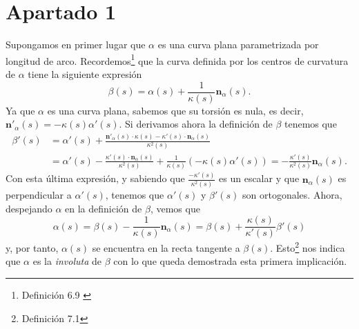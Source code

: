 \section{Apartado 1}
Supongamos en primer lugar que $\alpha$ es una curva plana parametrizada por
longitud de arco. Recordemos\footnote{Definición 6.9 \cite{sanjurjo}} que la
curva definida por los centros de curvatura de $\alpha$ tiene la siguiente
expresión
\[
\beta\left( s \right) = \alpha\left( s \right) + \frac{1}{\kappa\left( s
\right)} \mathbf{n}_{\alpha}\left( s \right).
\]
Ya que $\alpha$ es una curva plana, sabemos que su torsión es nula, es decir,
$\mathbf{n}'_{\alpha}\left( s \right) = - \kappa\left( s
\right)\alpha'\left( s \right)$. Si derivamos ahora la definición de $\beta$
tenemos que
\begin{align*}
\beta'\left( s \right) &= \alpha'\left( s \right) +
\frac{\mathbf{n}'_{\alpha}\left( s \right) \cdot \kappa\left( s \right) -
\kappa'\left( s \right) \cdot \mathbf{n}_{\alpha}\left( s
\right)}{\kappa^2\left( s \right)} \\ &= \alpha'\left( s \right) -
\frac{\kappa'\left( s \right) \cdot \mathbf{n}_{\alpha}\left( s
\right)}{\kappa^2\left( s \right)} + \frac{1}{\kappa\left( s \right)} \left(
-\kappa\left( s \right) \alpha'\left( s \right) \right) =
\boxed{-\frac{\kappa'\left( s \right)}{\kappa^2\left( s \right)}
\mathbf{n}_{\alpha}\left( s \right)}.
\end{align*}
Con esta última expresión, y sabiendo que $\frac{-\kappa'\left( s
\right)}{\kappa^2\left( s \right)}$ es un escalar y que
$\mathbf{n}_{\alpha}\left( s \right)$ es perpendicular a $\alpha'\left( s \right)$, tenemos que
$\alpha'\left( s \right)$ y $\beta'\left( s \right)$ son ortogonales. Ahora,
despejando $\alpha$ en la definición de $\beta$, vemos que
\[
\alpha\left( s \right) = \beta\left( s \right) - \frac{1}{\kappa\left( s
\right)} \mathbf{n}_{\alpha}\left( s \right) = \beta\left( s \right) + \frac{\kappa\left(
s\right)}{\kappa'\left( s \right)} \beta'\left( s \right)
\]
y, por tanto, $\alpha\left( s \right)$ se encuentra en la recta tangente a
$\beta\left( s \right)$. Esto\footnote{Definición 7.1\cite{sanjurjo}} nos indica
que $\alpha$ es la \textit{involuta} de $\beta$ con lo que queda demostrada esta
primera implicación.

